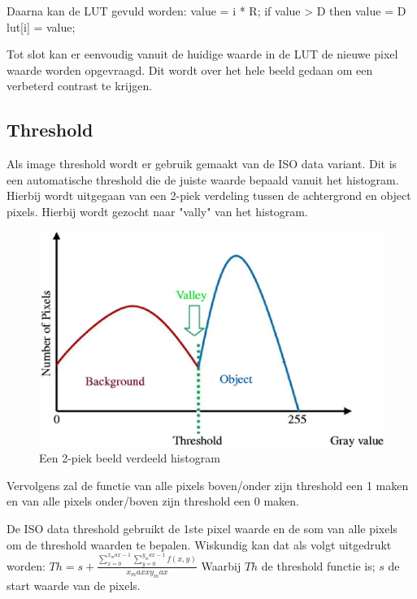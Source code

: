 Daarna kan de LUT gevuld worden:
value = i * R;
if value > D then value = D
lut[i] = value;

Tot slot kan er eenvoudig vanuit de huidige waarde in de LUT de nieuwe pixel waarde 
worden opgevraagd. Dit wordt over het hele beeld gedaan om een verbeterd contrast te 
krijgen.

\subsection{Threshold}
\label{sub:threshold}
Als image threshold wordt er gebruik gemaakt van de ISO data variant. Dit is een 
automatische threshold die de juiste waarde bepaald vanuit het histogram. Hierbij 
wordt uitgegaan van een 2-piek verdeling tussen de achtergrond en object pixels.
Hierbij wordt gezocht naar "vally" van het histogram.

\begin{figure}
    \begin{center}
        \includegraphics[scale=1]{figures/histogram.png}
    \end{center}
    \caption{Een 2-piek beeld verdeeld histogram}
    \label{fig:histogram}
\end{figure}

Vervolgens zal de functie van alle pixels boven/onder zijn threshold een 1 maken 
en van alle pixels onder/boven zijn threshold een 0 maken.

De ISO data threshold gebruikt de 1ste pixel waarde en de som van alle pixels om 
de threshold waarden te bepalen.
Wiskundig kan dat als volgt uitgedrukt worden:
$Th = s + \frac{\sum\limits_{x=0}^{x_max-1} \sum\limits_{y=0}^{y_max-1} f(x, y)}{x_max x y_max}  $
Waarbij $Th$ de threshold functie is;
$s$ de start waarde van de pixels.

